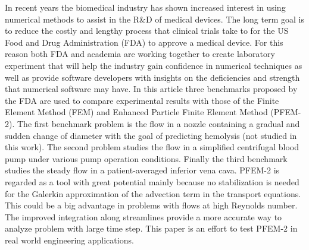 In recent years the biomedical industry has shown increased interest in using numerical methods to assist in the R\&D of medical devices. The long term goal is to reduce the costly and lengthy process that clinical trials take to for the US Food and Drug Administration (FDA) to approve a medical device. For this reason both FDA and academia are working together to create laboratory experiment that will help the industry gain confidence in numerical techniques as well as provide software developers with insights on the deficiencies and strength that numerical software may have. In this article three benchmarks proposed by the FDA are used to compare experimental results with those of the Finite Element Method (FEM) and Enhanced Particle Finite Element Method (PFEM-2). The first benchmark problem is the flow in a nozzle
containing a gradual and sudden change of diameter with the goal of predicting hemolysis (not studied in this work). The second problem studies the flow in a simplified centrifugal
blood pump under various pump operation conditions. Finally the third benchmark studies the steady flow in a patient-averaged inferior vena cava. PFEM-2 is regarded as a tool with great potential mainly because no stabilization is needed for the Galerkin approximation of the advection term in the transport equations. This could be a big advantage in problems with flows at high Reynolds number. The improved integration along streamlines provide a more accurate way to analyze problem with large time step. This paper is an effort to test PFEM-2 in real world engineering applications.
